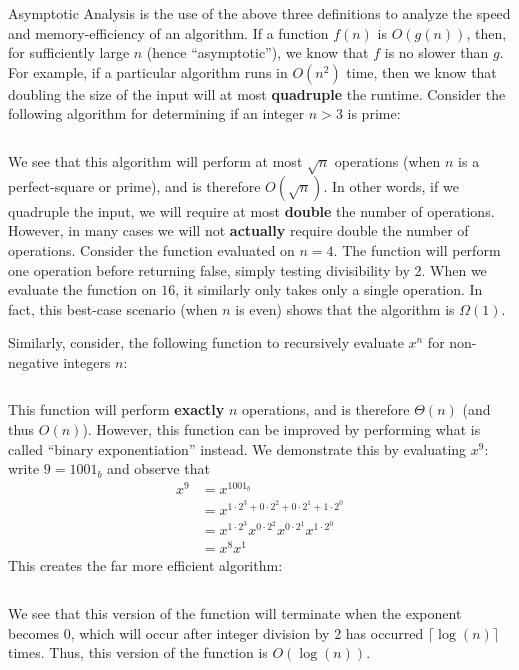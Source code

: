 \documentclass[a4paper]{article}
\begin{document}
Asymptotic Analysis is the use of the above three definitions to analyze the speed and memory-efficiency of an algorithm. If a function $f(n)$ is $O(g(n))$, then, for sufficiently large $n$ (hence ``asymptotic''), we know that $f$ is no slower than $g$. For example, if a particular algorithm runs in $O(n^2)$ time, then we know that doubling the size of the input will at most \textbf{quadruple} the runtime. Consider the following algorithm for determining if an integer $n>3$ is prime:

\inputminted[frame=lines,bgcolor=lightgray]{C++}{isPrime.cpp}

We see that this algorithm will perform at most $\sqrt{n}$ operations (when $n$ is a perfect-square or prime), and is therefore $O(\sqrt{n})$. In other words, if we quadruple the input, we will require at most \textbf{double} the number of operations. However, in many cases we will not \textbf{actually} require double the number of operations. Consider the function evaluated on $n=4$. The function will perform one operation before returning false, simply testing divisibility by 2. When we evaluate the function on $16$, it similarly only takes only a single operation. In fact, this best-case scenario (when $n$ is even) shows that the algorithm is $\Omega(1)$. 

Similarly, consider, the following function to recursively evaluate $x^n$ for non-negative integers $n$:

\inputminted[frame=lines,bgcolor=lightgray]{C++}{recursivePow.cpp}

This function will perform \textbf{exactly} $n$ operations, and is therefore $\Theta(n)$ (and thus $O(n)$). However, this function can be improved by performing what is called ``binary exponentiation'' instead. We demonstrate this by evaluating $x^9$: write $9=1001_b$ and observe that\begin{align*}x^9&=x^{1001_b}\\&=x^{1\cdot2^3+0\cdot2^2+0\cdot2^1+1\cdot2^0}\\&=x^{1\cdot2^3}x^{0\cdot2^2}x^{0\cdot2^1}x^{1\cdot2^0}\\&=x^8x^1\end{align*} This creates the far more efficient algorithm:\pagebreak

\inputminted[frame=lines,bgcolor=lightgray]{C++}{binaryPow.cpp}

We see that this version of the function will terminate when the exponent becomes 0, which will occur after integer division by 2 has occurred $\lceil\log(n)\rceil$ times. Thus, this version of the function is $O(\log(n))$.
\end{document}
